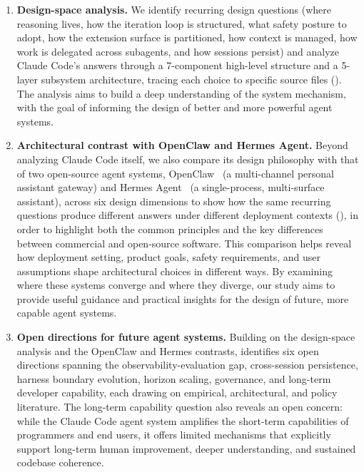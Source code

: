 \begin{enumerate}
  \item \textbf{Design-space analysis.} We identify recurring design questions (where reasoning lives, how the iteration loop is structured, what safety posture to adopt, how the extension surface is partitioned, how context is managed, how work is delegated across subagents, and how sessions persist) and analyze Claude Code's answers through a 7-component high-level structure and a 5-layer subsystem architecture, tracing each choice to specific source files (). The analysis aims to build a deep understanding of the system mechanism, with the goal of informing the design of better and more powerful agent systems.
  \item \textbf{Architectural contrast with OpenClaw and Hermes Agent.}
  Beyond analyzing Claude Code itself, we also compare its design philosophy with that of two open-source agent systems, OpenClaw~\citep{openclaw2026} (a multi-channel personal assistant gateway) and Hermes Agent~\citep{hermesagent2026} (a single-process, multi-surface assistant), across six design dimensions to show how the same recurring questions produce different answers under different deployment contexts (), in order to highlight both the common principles and the key differences between commercial and open-source software. This comparison helps reveal how deployment setting, product goals, safety requirements, and user assumptions shape architectural choices in different ways. By examining where these systems converge and where they diverge, our study aims to provide useful guidance and practical insights for the design of future, more capable agent systems.

  \item \textbf{Open directions for future agent systems.} Building on the design-space analysis and the OpenClaw and Hermes contrasts,  identifies six open directions spanning the observability-evaluation gap, cross-session persistence, harness boundary evolution, horizon scaling, governance, and long-term developer capability, each drawing on empirical, architectural, and policy literature. The long-term capability question also reveals an open concern: while the Claude Code agent system amplifies the short-term capabilities of programmers and end users, it offers limited mechanisms that explicitly support long-term human improvement, deeper understanding, and sustained codebase coherence. 

\end{enumerate}


